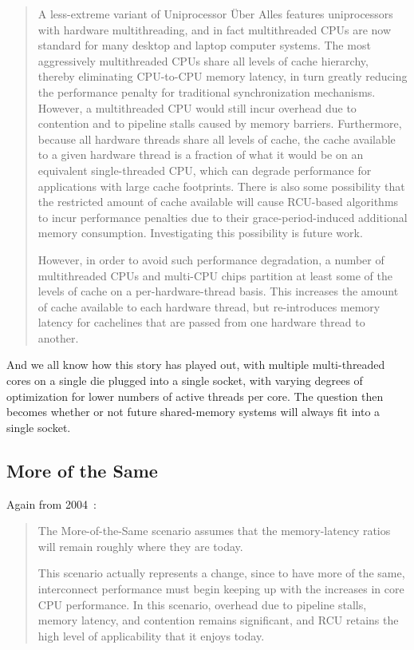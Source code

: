 \begin{quote}
	A less-extreme variant of Uniprocessor \"Uber Alles features
	uniprocessors with hardware multithreading, and in fact
	multithreaded CPUs are now standard for many desktop and laptop
	computer systems.
	The most aggressively multithreaded CPUs share all levels of
	cache hierarchy, thereby eliminating CPU-to-CPU memory latency,
	in turn greatly reducing the performance penalty for traditional
	synchronization mechanisms.
	However, a multithreaded CPU would still incur overhead due to
	contention and to pipeline stalls caused by memory barriers.
	Furthermore, because all hardware threads share all levels
	of cache, the cache available to a given hardware thread is a
	fraction of what it would be on an equivalent single-threaded
	CPU, which can degrade performance for applications with large
	cache footprints.
	There is also some possibility that the restricted amount of cache
	available will cause RCU-based algorithms to incur performance
	penalties due to their grace-period-induced additional memory
	consumption.
	Investigating this possibility is future work.

	However, in order to avoid such performance degradation, a number
	of multithreaded CPUs and multi-CPU chips partition at least
	some of the levels of cache on a per-hardware-thread basis.
	This increases the amount of cache available to each hardware
	thread, but re-introduces memory latency for cachelines that
	are passed from one hardware thread to another.
\end{quote}

And we all know how this story has played out, with multiple multi-threaded
cores on a single die plugged into a single socket, with varying degrees
of optimization for lower numbers of active threads per core.
The question then becomes whether or not future shared-memory systems will
always fit into a single socket.

\subsection{More of the Same}
\label{sec:meas:More of the Same}

Again from 2004~\cite{PaulEdwardMcKenneyPhD}:

\begin{quote}
	The More-of-the-Same scenario assumes that the memory-latency
	ratios will remain roughly where they are today.

	This scenario actually represents a change, since to have more
	of the same, interconnect performance must begin keeping up
	with the  increases in core CPU performance.
	In this scenario, overhead due to pipeline stalls, memory latency,
	and contention remains significant, and RCU retains the high
	level of applicability that it enjoys today.
\end{quote}

